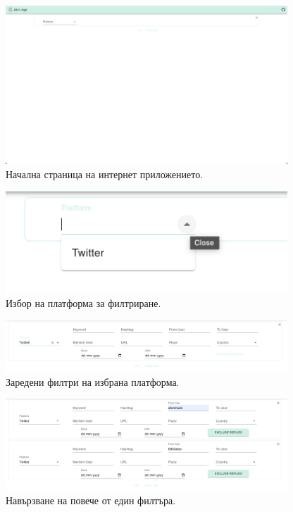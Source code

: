 \documentclass{article}
\begin{document}
\begin{figure}[H]
\centering
\captionsetup{justification=centering}
\includegraphics[width=400px, keepaspectratio]{chapter-07/start-page.png}
\caption{Начална страница на интернет приложението.}
\end{figure}

\begin{figure}[H]
\centering
\captionsetup{justification=centering}
\includegraphics[width=400px, keepaspectratio]{chapter-07/platform-choose.png}
\caption{Избор на платформа за филтриране.}
\end{figure}

\begin{figure}[H]
\centering
\captionsetup{justification=centering}
\includegraphics[width=400px, keepaspectratio]{chapter-07/platform-filters.png}
\caption{Заредени филтри на избрана платформа.}
\end{figure}

\begin{figure}[H]
\centering
\captionsetup{justification=centering}
\includegraphics[width=400px, keepaspectratio]{chapter-07/multiple-filters.png}
\caption{Навързване на повече от един филтъра.}
\end{figure}
\end{document}
